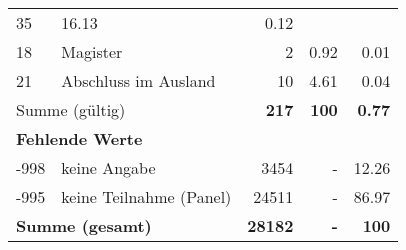 \begin{longtable}{lXrrr}
       \num{35} &
       \num[round-mode=places,round-precision=2]{16,13} &
         \num[round-mode=places,round-precision=2]{0,12} \\

     18 &
     \multicolumn{1}{X}{ Magister   } &


       \num{2} &
       \num[round-mode=places,round-precision=2]{0,92} &
         \num[round-mode=places,round-precision=2]{0,01} \\

     21 &
     \multicolumn{1}{X}{ Abschluss im Ausland   } &


       \num{10} &
       \num[round-mode=places,round-precision=2]{4,61} &
         \num[round-mode=places,round-precision=2]{0,04} \\
     \midrule
     \multicolumn{2}{l}{Summe (gültig)} &
       \textbf{\num{217}} &
     \textbf{100} &
       \textbf{\num[round-mode=places,round-precision=2]{0,77}} \\
     \multicolumn{5}{l}{\textbf{Fehlende Werte}}\\
       -998 &
       keine Angabe &
         \num{3454} &
        - &
         \num[round-mode=places,round-precision=2]{12,26} \\
       -995 &
       keine Teilnahme (Panel) &
         \num{24511} &
        - &
         \num[round-mode=places,round-precision=2]{86,97} \\
     \midrule
     \multicolumn{2}{l}{\textbf{Summe (gesamt)}} &
          \textbf{\num{28182}} &
        \textbf{-} &
        \textbf{100} \\
     \bottomrule
     \end{longtable}
     
